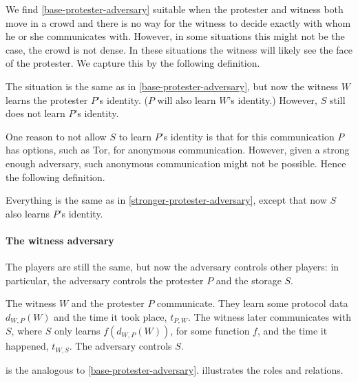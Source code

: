 We find \cref{base-protester-adversary} suitable when the protester and witness 
both move in a crowd and there is no way for the witness to decide exactly with 
whom he or she communicates with.
However, in some situations this might not be the case, \eg the crowd is not 
dense.
In these situations the witness will likely see the face of the protester.
We capture this by the following definition.

\begin{definition}%
  \label{stronger-protester-adversary}
  The situation is the same as in \cref{base-protester-adversary}, but now the 
  witness \(W\) learns the protester \(P\)'s identity.
  (\(P\) will also learn \(W\)'s identity.)
  However, \(S\) still does not learn \(P\)'s identity.
\end{definition}

One reason to not allow \(S\) to learn \(P\)'s identity is that for this 
communication \(P\) has options, such as \ac{Tor}, for anonymous communication.
However, given a strong enough adversary, such anonymous communication might 
not be possible.
Hence the following definition.

\begin{definition}%
  \label{strongest-protester-adversary}
  Everything is the same as in \cref{stronger-protester-adversary}, except that 
  now \(S\) also learns \(P\)'s identity.
\end{definition}

\paragraph{The witness adversary}

The players are still the same, but now the adversary controls other players: 
in particular, the adversary controls the protester \(P\) and the storage 
\(S\).

\begin{definition}\label{base-witness-adversary}
  The witness \(W\) and the protester \(P\) communicate.
  They learn some protocol data \(d_{W,P}(W)\) and the time it took place, 
  \(t_{P,W}\).
  The witness later communicates with \(S\), where \(S\) only learns 
  \(f(d_{W,P}(W))\), for some function \(f\), and the time it happened, 
  \(t_{W,S}\).
  The adversary controls \(S\).
\end{definition}

 is the analogous to 
\cref{base-protester-adversary}.
 illustrates the roles and relations.


